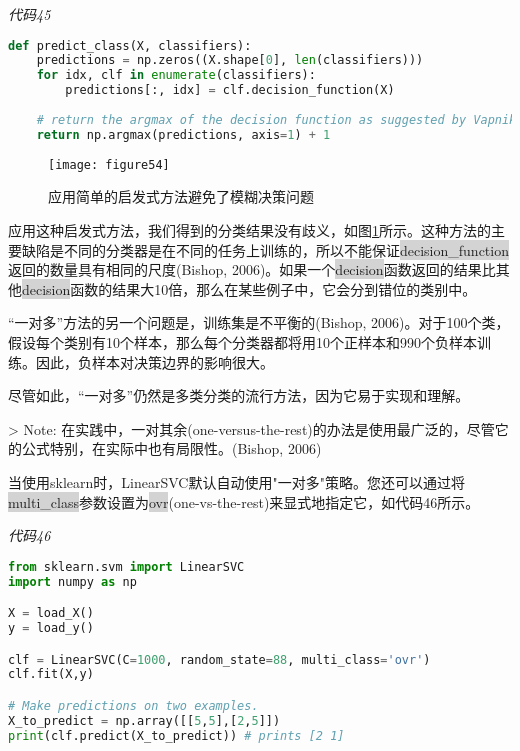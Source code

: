 \emph{代码45}

\begin{lstlisting}[language=python]
def predict_class(X, classifiers): 
    predictions = np.zeros((X.shape[0], len(classifiers))) 
    for idx, clf in enumerate(classifiers): 
        predictions[:, idx] = clf.decision_function(X) 
    
    # return the argmax of the decision function as suggested by Vapnik.
    return np.argmax(predictions, axis=1) + 1
\end{lstlisting}

\begin{figure}[ht]
	\centering
	\texttt{[image: figure54]}
	\caption{应用简单的启发式方法避免了模糊决策问题}
	\label{figure54}
\end{figure}

应用这种启发式方法，我们得到的分类结果没有歧义，如图\ref{figure54}所示。这种方法的主要缺陷是不同的分类器是在不同的任务上训练的，所以不能保证\colorbox{lightgray}{decision\_function}返回的数量具有相同的尺度(Bishop, 2006)。如果一个\colorbox{lightgray}{decision}函数返回的结果比其他\colorbox{lightgray}{decision}函数的结果大10倍，那么在某些例子中，它会分到错位的类别中。

“一对多”方法的另一个问题是，训练集是不平衡的(Bishop, 2006)。对于100个类，假设每个类别有10个样本，那么每个分类器都将用10个正样本和990个负样本训练。因此，负样本对决策边界的影响很大。

尽管如此，“一对多”仍然是多类分类的流行方法，因为它易于实现和理解。

> Note: 在实践中，一对其余(one-versus-the-rest)的办法是使用最广泛的，尽管它的公式特别，在实际中也有局限性。(Bishop, 2006)

当使用sklearn时，LinearSVC默认自动使用"一对多"策略。您还可以通过将\colorbox{lightgray}{multi\_class}参数设置为\colorbox{lightgray}{ovr}(one-vs-the-rest)来显式地指定它，如代码46所示。

\emph{代码46}

\begin{lstlisting}[language=python]
from sklearn.svm import LinearSVC 
import numpy as np 

X = load_X() 
y = load_y() 

clf = LinearSVC(C=1000, random_state=88, multi_class='ovr') 
clf.fit(X,y) 

# Make predictions on two examples. 
X_to_predict = np.array([[5,5],[2,5]]) 
print(clf.predict(X_to_predict)) # prints [2 1]
\end{lstlisting}

